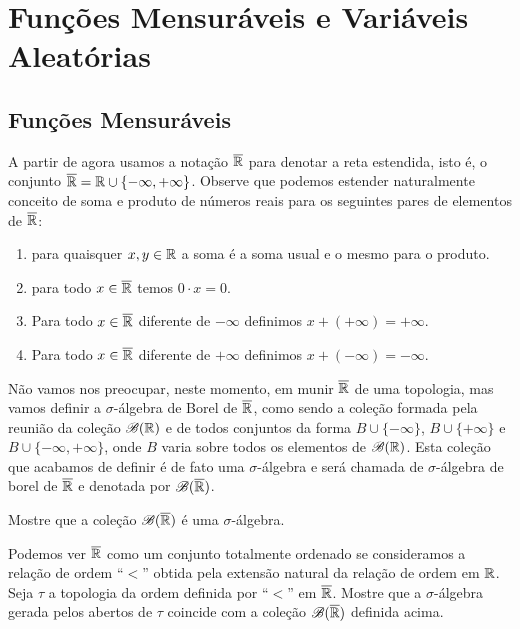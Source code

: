 \chapter[Aula 5]{Funções Mensuráveis e Variáveis Aleatórias}
\chaptermark{}

\section{Funções Mensuráveis}

A partir de agora usamos a notação $\overline{\mathbb{R}}$ 
para denotar a reta estendida, isto é, o conjunto
$\overline{\mathbb{R}} = \mathbb{R}\cup\{-\infty,+\infty\}$. 
Observe que podemos estender naturalmente conceito 
de soma e produto  de números reais
para os seguintes pares de elementos 
de $\overline{\mathbb{R}}$:
\begin{enumerate}
	\item 
	para quaisquer $x,y\in \mathbb{R}$ a soma é a soma usual 
	e o mesmo para o produto. 
	
	\item para todo $x\in \overline{\mathbb{R}}$ temos 
	$0\cdot x=0$.
	
	\item Para todo $x\in \overline{\mathbb{R}}$ diferente de 
	$-\infty$ definimos $x+(+\infty)=+\infty$.

	\item Para todo $x\in \overline{\mathbb{R}}$ diferente de 
	$+\infty$ definimos $x+(-\infty)=-\infty$.
\end{enumerate}

Não vamos nos preocupar, neste momento, em munir $\overline{\mathbb{R}}$ 
de uma topologia, mas vamos definir a $\sigma$-álgebra
de Borel de $\overline{\mathbb{R}}$,
como sendo a coleção formada pela reunião da
coleção $\mathscr{B}(\mathbb{R})$ 
e de todos conjuntos da forma 
$B\cup\{-\infty\}$, $B\cup\{+\infty\}$ e $B\cup\{-\infty,+\infty\}$,
onde $B$ varia sobre todos os elementos de $\mathscr{B}(\mathbb{R})$.
Esta coleção que acabamos de definir
é de fato uma $\sigma$-álgebra e será chamada de $\sigma$-álgebra
de borel de $\overline{\mathbb{R}}$ e denotada por $\mathscr{B}(\overline{\mathbb{R}})$.

\begin{exercicio}
	Mostre que a coleção $\mathscr{B}(\overline{\mathbb{R}})$ 
	é uma $\sigma$-álgebra.
\end{exercicio}

\begin{exercicio}
	Podemos ver $\overline{\mathbb{R}}$ como um conjunto totalmente ordenado se 
	consideramos a relação de ordem ``$<$'' obtida pela extensão natural 
	da relação de ordem em $\mathbb{R}$.
	Seja $\tau$ a topologia da ordem definida por ``$<$'' 
	em $\overline{\mathbb{R}}$. Mostre que a $\sigma$-álgebra gerada pelos 
	abertos de $\tau$ coincide com a coleção $\mathscr{B}(\overline{\mathbb{R}})$
	definida acima. 
	
\end{exercicio}










